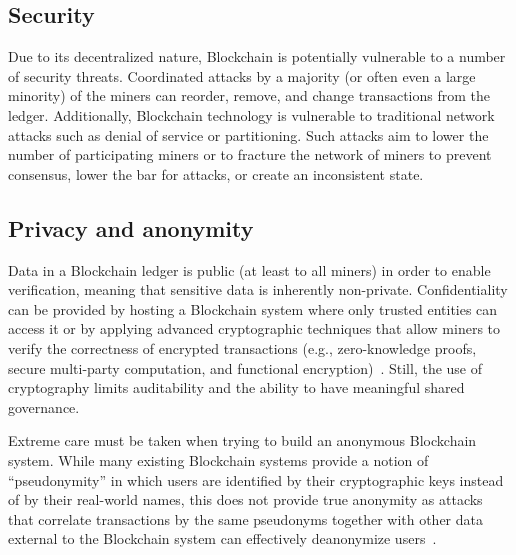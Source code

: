 \subsection{Security}
Due to its decentralized nature, Blockchain is potentially vulnerable to a number of security threats.
Coordinated attacks by a majority (or often even a large minority) of the miners can reorder, remove, and change transactions from the ledger. 
Additionally, Blockchain technology is vulnerable to traditional network attacks such as denial of service or partitioning.
Such attacks aim to lower the number of participating miners or to fracture the network of miners to prevent consensus, lower the bar for attacks, or create an inconsistent state.

\subsection{Privacy and anonymity}
Data in a Blockchain ledger is public (at least to all miners) in order to enable verification, meaning that sensitive data is inherently non-private.
Confidentiality can be provided by hosting a Blockchain system where only trusted entities can access it or by applying advanced cryptographic techniques that allow miners to verify the correctness of encrypted transactions (e.g., zero-knowledge proofs, secure multi-party computation, and functional encryption)~\cite{SP:KMSWP16}.
Still, the use of cryptography limits auditability and the ability to have 
meaningful shared governance.

Extreme care must be taken when trying to build an anonymous Blockchain system.
While many existing Blockchain systems provide a notion of ``pseudonymity'' in which users are identified by their cryptographic keys instead of by their real-world names, this does not provide true anonymity as attacks that correlate transactions by the same pseudonyms together with other data external to the Blockchain system can effectively deanonymize users~\cite{DBLP:journals/corr/abs-1708-04748}.

